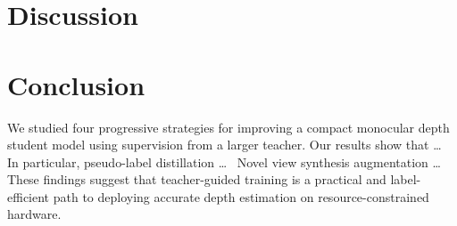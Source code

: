 \documentclass{article}
\begin{document}
\section{Discussion}
\label{sec:discussion}




\section{Conclusion}
\label{sec:conclusion}


We studied four progressive strategies for improving a compact monocular depth student model using supervision from a larger teacher.
Our results show that \ldots\ %
In particular, pseudo-label distillation \ldots\ %
Novel view synthesis augmentation \ldots\ %
These findings suggest that teacher-guided training is a practical and label-efficient path to deploying accurate depth estimation on resource-constrained hardware.




\end{document}
